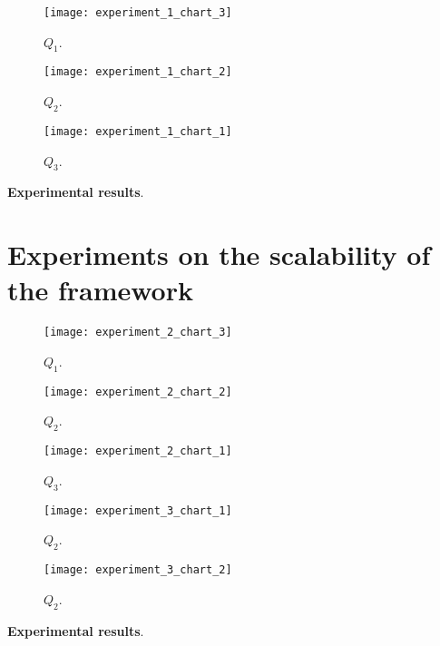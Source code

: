 
\begin{figure}[H]
  \centering
  \texttt{[image: experiment\_1\_chart\_3]}
  \caption{$Q_{1}$.}
  \label{fig:???}
\end{figure}

\begin{figure}[H]
  \centering
  \texttt{[image: experiment\_1\_chart\_2]}
  \caption{$Q_{2}$.}
  \label{fig:???}
\end{figure}

\begin{figure}[H]
  \centering
  \texttt{[image: experiment\_1\_chart\_1]}
  \caption{$Q_{3}$.}
  \label{fig:???}
\end{figure}


\textbf{Experimental results}.

\section{Experiments on the scalability of the framework}\label{sec:scalability}

\begin{figure}[H]
  \centering
  \texttt{[image: experiment\_2\_chart\_3]}
  \caption{$Q_{1}$.}
  \label{fig:???}
\end{figure}

\begin{figure}[H]
  \centering
  \texttt{[image: experiment\_2\_chart\_2]}
  \caption{$Q_{2}$.}
  \label{fig:???}
\end{figure}

\begin{figure}[H]
  \centering
  \texttt{[image: experiment\_2\_chart\_1]}
  \caption{$Q_{3}$.}
  \label{fig:???}
\end{figure}



\begin{figure}[H]
  \centering
  \texttt{[image: experiment\_3\_chart\_1]}
  \caption{$Q_{2}$.}
  \label{fig:???}
\end{figure}

\begin{figure}[H]
  \centering
  \texttt{[image: experiment\_3\_chart\_2]}
  \caption{$Q_{2}$.}
  \label{fig:???}
\end{figure}

\textbf{Experimental results}.

